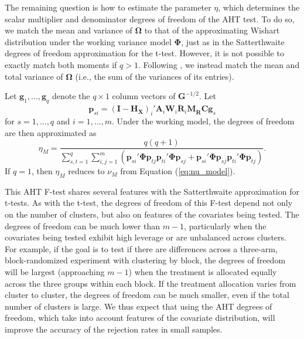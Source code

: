 \documentclass[12pt]{article}\usepackage[]{graphicx}\usepackage[]{color}
\newcommand{\bm}{\mathbf}
\newcommand{\bs}{\boldsymbol}
\begin{document}
The remaining question is how to estimate the parameter $\eta$, which determines the scalar multiplier and denominator degrees of freedom of the AHT test. 
To do so, we match the mean and variance of $\bs\Omega$ to that of the approximating Wishart distribution under the working variance model $\bs\Phi$, just as in the Satterthwaite degrees of freedom approximation for the t-test. 
However, it is not possible to exactly match both moments if $q > 1$.
Following , we instead match the mean and total variance of $\bs\Omega$ (i.e., the sum of the variances of its entries).

Let $\bm{g}_1,...,\bm{g}_q$ denote the $q \times 1$ column vectors of $\bm{G}^{-1/2}$. 
Let \[
\bm{p}_{si} = \left(\bm{I} - \bm{H_X}\right)_i' \bm{A}_i \bm{W}_i \bm{\ddot{R}}_i \bm{M_{\ddot{R}}}\bm{C} \bm{g}_s \]
for $s = 1,...,q$ and $i = 1,...,m$.
Under the working model, the degrees of freedom are then approximated as
\begin{equation}
\label{eq:eta_model}
\eta_M = \frac{q(q + 1)}{\sum_{s,t=1}^q \sum_{i,j=1}^m \left(\bm{p}_{si}'\bs\Phi\bm{p}_{tj} \bm{p}_{ti}'\bs\Phi\bm{p}_{sj} + \bm{p}_{si}'\bs\Phi\bm{p}_{sj} \bm{p}_{ti}'\bs\Phi\bm{p}_{tj}\right)}.
\end{equation}
If $q = 1$, then $\eta_M$ reduces to $\nu_M$ from Equation (\ref{eq:nu_model}).

This AHT F-test shares several features with the Satterthwaite approximation for t-tests. As with the t-test, the degrees of freedom of this F-test depend not only on the number of clusters, but also on features of the covariates being tested. 
The degrees of freedom can be much lower than $m - 1$, particularly when the covariates being tested exhibit high leverage or are unbalanced across clusters. 
For example, if the goal is to test if there are differences across a three-arm, block-randomized experiment with clustering by block, the degrees of freedom will be largest (approaching $m - 1$) when the treatment is allocated equally across the three groups within each block. 
If the treatment allocation varies from cluster to cluster, the degrees of freedom can be much smaller, even if the total number of clusters is large. 
We thus expect that using the AHT degrees of freedom, which take into account features of the covariate distribution, will improve the accuracy of the rejection rates in small samples. 
\end{document}
